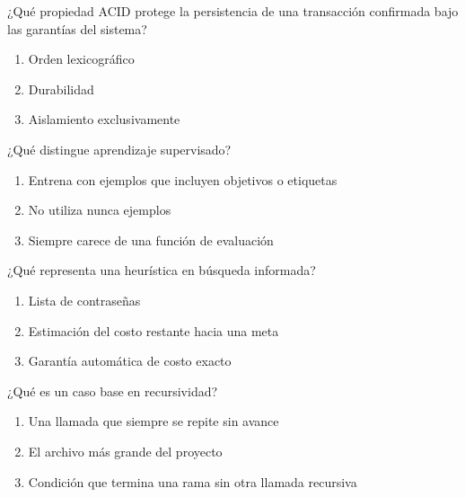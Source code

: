\noindent\begin{minipage}{\linewidth}\setlength{\parskip}{4pt}\label{q:S-066}
¿Qué propiedad ACID protege la persistencia de una transacción confirmada bajo las garantías del sistema?
\begin{enumerate}[label=\Alph*),nosep]
\item Orden lexicográfico
\item Durabilidad
\item Aislamiento exclusivamente
\end{enumerate}\end{minipage}\par\medskip

\noindent\begin{minipage}{\linewidth}\setlength{\parskip}{4pt}\label{q:S-067}
¿Qué distingue aprendizaje supervisado?
\begin{enumerate}[label=\Alph*),nosep]
\item Entrena con ejemplos que incluyen objetivos o etiquetas
\item No utiliza nunca ejemplos
\item Siempre carece de una función de evaluación
\end{enumerate}\end{minipage}\par\medskip

\noindent\begin{minipage}{\linewidth}\setlength{\parskip}{4pt}\label{q:S-068}
¿Qué representa una heurística en búsqueda informada?
\begin{enumerate}[label=\Alph*),nosep]
\item Lista de contraseñas
\item Estimación del costo restante hacia una meta
\item Garantía automática de costo exacto
\end{enumerate}\end{minipage}\par\medskip

\noindent\begin{minipage}{\linewidth}\setlength{\parskip}{4pt}\label{q:S-069}
¿Qué es un caso base en recursividad?
\begin{enumerate}[label=\Alph*),nosep]
\item Una llamada que siempre se repite sin avance
\item El archivo más grande del proyecto
\item Condición que termina una rama sin otra llamada recursiva
\end{enumerate}\end{minipage}\par\medskip

